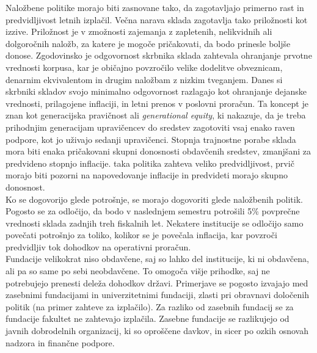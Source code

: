 \documentclass[12pt, a4paper]{article}
\begin{document}
Naložbene politike morajo biti zasnovane tako, da zagotavljajo primerno rast in predvidljivost letnih izplačil. Večna narava sklada zagotavlja tako priložnosti kot izzive. Priložnost je v zmožnosti zajemanja z zapletenih, nelikvidnih ali dolgoročnih naložb, za katere je mogoče pričakovati, da bodo prinesle boljše donose. Zgodovinsko je odgovornost skrbnika sklada zahtevala ohranjanje prvotne vrednosti korpusa, kar je običajno povzročilo velike dodelitve obveznicam, denarnim ekvivalentom in drugim naložbam z nizkim tveganjem. Danes si skrbniki skladov svojo minimalno odgovornost razlagajo kot ohranjanje dejanske vrednosti, prilagojene inflaciji, in letni prenos v poslovni proračun. Ta koncept je znan kot generacijska pravičnost ali \textit{generational equity}, ki nakazuje, da je treba prihodnjim generacijam upravičencev do sredstev zagotoviti vsaj enako raven podpore, kot jo uživajo sedanji upravičenci. Stopnja trajnostne porabe sklada mora biti enaka pričakovani skupni donosnosti obdavčenih sredstev, zmanjšani za predvideno stopnjo inflacije. taka politika zahteva veliko predvidljivost, prvič morajo biti pozorni na napovedovanje inflacije in predvideti morajo skupno donosnost. \\

Ko se dogovorijo glede potrošnje, se morajo dogovoriti glede naložbenih politik. Pogosto se za odločijo, da bodo v naslednjem semestru potrošili 5\% povprečne vrednosti sklada zadnjih treh fiskalnih let. Nekatere institucije se odločijo samo povečati potrošnjo za toliko, kolikor se je povečala inflacija, kar povzroči predvidljiv tok dohodkov na operativni proračun. \cite{investment1}\\

Fundacije velikokrat niso obdavčene, saj so lahko del institucije, ki ni obdavčena, ali pa so same po sebi neobdavčene. To omogoča višje prihodke, saj ne potrebujejo prenesti deleža dohodkov državi. Primerjave se pogosto izvajajo med zasebnimi fundacijami in univerzitetnimi fundaciji, zlasti pri obravnavi določenih politik (na primer zahteve za izplačilo). Za razliko od zasebnih fundacij se za fundacije fakultet ne zahtevajo izplačila. Zasebne fundacije se razlikujejo od javnih dobrodelnih organizacij, ki so oproščene davkov, in sicer po ozkih osnovah nadzora in finančne podpore.\\
\end{document}
